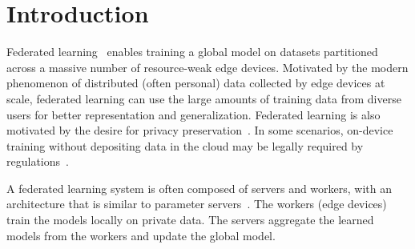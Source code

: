 \documentclass{opt2020} %
\begin{document}

\DeclarePairedDelimiter\ceil{\lceil}{\rceil}
\DeclarePairedDelimiter\floor{\lfloor}{\rfloor}

\newcommand{\ip}[2]{\left\langle #1, #2 \right \rangle}

\newtheorem{assumption}{Assumption}


\newcommand{\pfcomment}[1]{
\tag*{$\triangleright$ #1}
}


\newcommand{\mcir}[1]{{\large \textcircled{\small #1}}}

\begin{abstract}%
Federated learning enables training on a massive number of edge devices. To improve flexibility and scalability, we propose a new asynchronous federated optimization algorithm. We prove that the proposed approach has near-linear convergence to a global optimum, for both strongly convex and a restricted family of non-convex problems. Empirical results show that the proposed algorithm converges quickly and tolerates staleness in various applications.
\end{abstract}

\section{Introduction}

Federated learning~\cite{konevcny2016federated,mcmahan2016communication} enables training a global model on datasets partitioned across a massive number of resource-weak edge devices.
Motivated by the modern phenomenon of distributed (often personal) data collected by edge devices at scale, federated learning can use the large amounts of training data from diverse users for better representation and generalization.
Federated learning is also motivated by the desire for privacy preservation~\cite{bonawitz2019towards,bonawitz2017practical}.
In some scenarios, on-device training without depositing data in the cloud may be legally required by regulations~\cite{act1996health,FERPA,GDPR}.

A federated learning system is often composed of servers and workers, with an architecture that is similar to parameter servers~\cite{li2014scaling,li2014communication,ho2013more}. The workers (edge devices) train the models locally on private data. The servers aggregate the learned models from the workers and update the global model.
\end{document}

